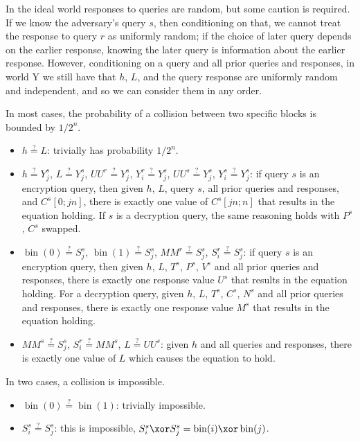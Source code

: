 \documentclass[letterpaper,11pt]{article}
\newcommand*{\MM}{\mathit{MM}}
\newcommand*{\qeq}{\stackrel{\text{?}}{=}}
\newcommand*{\UU}{\mathit{UU}}
\DeclareMathOperator{\fromint}{bin}
\begin{document}
In the ideal world responses to queries are random,
but some caution is required.
If we know the adversary's query \(s\), then conditioning on that,
we cannot treat the response to query \(r\) as uniformly random;
if the choice of later query depends on the earlier response,
knowing the later query is information about the earlier response.
However, conditioning on a query and all prior queries and responses,
in world Y we still have that \(h\), \(L\), and the
query response are uniformly random and independent,
and so we can consider them in any order.

In most cases, the probability of a collision
between two specific blocks is bounded by \(1/2^n\).

\begin{itemize}
    \item \(h \qeq L\): trivially has probability \(1/2^n\).
    \item
    \(h \qeq Y_j^s\),
    \(L \qeq Y_j^s\),
    \(\UU^r \qeq Y_j^s\),
    \(Y_i^r \qeq Y_j^s\),
    \(\UU^s \qeq Y_j^s\), 
    \(Y_i^s \qeq Y_j^s\): 
    if query \(s\) is an encryption query,
    then given \(h\), \(L\), query \(s\), 
    all prior queries and responses, and
    \(C^s[0;jn]\), there is exactly one value of
    \(C^s[jn;n]\) that results in the equation holding.
    If \(s\) is a decryption query, the same reasoning holds
    with \(P^s\), \(C^s\) swapped.
    \item 
    \(\fromint(0) \qeq S_j^s\),
    \(\fromint(1) \qeq S_j^s\),
    \(\MM^r \qeq S_j^s\),
    \(S_i^r \qeq S_j^s\):
    if query \(s\) is an encryption query,
    then given \(h\), \(L\), \(T^s\),
    \(P^s\), \(V^s\)
    and all prior queries and responses,
    there is exactly one response value \(U^s\)
    that results in the equation holding.
    For a decryption query, 
    given \(h\), \(L\), \(T^s\),
    \(C^s\), \(N^s\)
    and all prior queries and responses,
    there is exactly one response value \(M^s\)
    that results in the equation holding.
    \item
    \(\MM^s \qeq S_j^s\),
    \(S_i^r \qeq \MM^s\),
    \(L \qeq \UU^s\):
    given \(h\) and all queries and responses,
    there is exactly one value of \(L\)
    which causes the equation to hold.
\end{itemize}

In two cases, a collision is impossible.

\begin{itemize}
    \item \(\fromint(0) \qeq \fromint(1)\): trivially impossible.
    \item 
    \(S_i^s \qeq S_j^s\):
    this is impossible, 
    \(S_i^s \xor S_j^s = \fromint(i) \xor \fromint(j)\).
\end{itemize}
\end{document}

